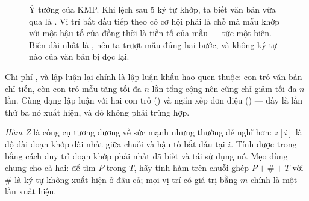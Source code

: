 \documentclass[../../algorithm.tex]{subfiles}
\begin{document}
\begin{figure}[H]\centering
{}
\caption{Ý tưởng của KMP. Khi lệch sau 5 ký tự khớp, ta biết văn bản vừa qua là . Vị trí bắt đầu tiếp theo có cơ hội phải là chỗ mà mẫu khớp với một hậu tố của  đồng thời là tiền tố của mẫu --- tức một biên. Biên dài nhất là , nên ta trượt mẫu đúng hai bước, và không ký tự nào của văn bản bị đọc lại.}
\label{fig:kmp}
\end{figure}

Chi phí , và lập luận lại chính là lập luận khấu hao quen thuộc: con trỏ văn bản chỉ tiến, còn con trỏ mẫu tăng tối đa \(n\) lần tổng cộng nên cũng chỉ giảm tối đa \(n\) lần. Cùng dạng lập luận với hai con trỏ () và ngăn xếp đơn điệu () --- đây là lần thứ ba nó xuất hiện, và đó không phải trùng hợp.

\emph{Hàm Z} là công cụ tương đương về sức mạnh nhưng thường dễ nghĩ hơn: \(z[i]\) là độ dài đoạn khớp dài nhất giữa chuỗi và hậu tố bắt đầu tại \(i\). Tính được trong  bằng cách duy trì đoạn khớp phải nhất đã biết và tái sử dụng nó. Mẹo dùng chung cho cả hai: để tìm \(P\) trong \(T\), hãy tính hàm trên chuỗi ghép \(P + \# + T\) với \(\#\) là ký tự không xuất hiện ở đâu cả; mọi vị trí có giá trị bằng \(m\) chính là một lần xuất hiện.
\end{document}

